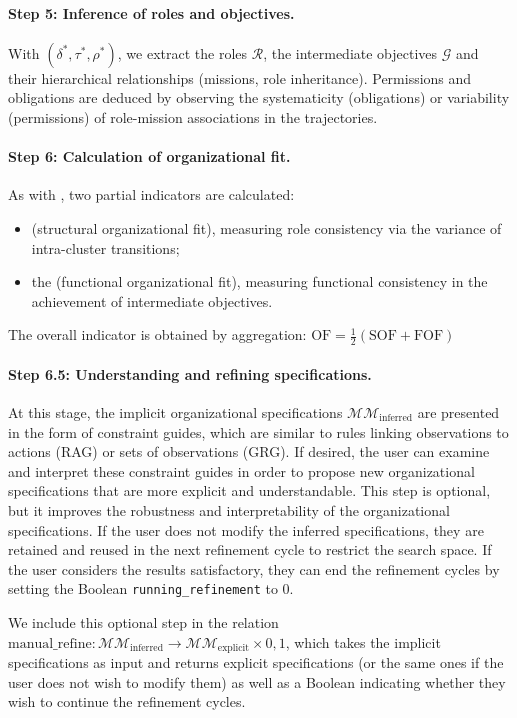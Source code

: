 \begin{itemize}
\paragraph{Step 5: Inference of roles and objectives. }
With $(\delta^*, \tau^*, \rho^*)$, we extract the roles $\mathcal{R}$, the intermediate objectives $\mathcal{G}$ and their hierarchical relationships (missions, role inheritance).
Permissions and obligations are deduced by observing the systematicity (obligations) or variability (permissions) of role-mission associations in the trajectories.

\paragraph{Step 6: Calculation of organizational fit.}
As with , two partial indicators are calculated:
\begin{itemize}
  \item \textbf{} (structural organizational fit), measuring role consistency via the variance of intra-cluster transitions;
  \item the \textbf{} (functional organizational fit), measuring functional consistency in the achievement of intermediate objectives.
\end{itemize}
The overall indicator is obtained by aggregation:
$\text{OF} = \frac{1}{2}(\text{SOF} + \text{FOF})$

\paragraph{Step 6.5: Understanding and refining specifications.}
At this stage, the implicit organizational specifications $\mathcal{MM}_{\text{inferred}}$ are presented in the form of constraint guides, which are similar to rules linking observations to actions (RAG) or sets of observations (GRG). If desired, the user can examine and interpret these constraint guides in order to propose new organizational specifications that are more explicit and understandable. This step is optional, but it improves the robustness and interpretability of the organizational specifications. If the user does not modify the inferred specifications, they are retained and reused in the next refinement cycle to restrict the search space. If the user considers the results satisfactory, they can end the refinement cycles by setting the Boolean \texttt{running_refinement} to 0.

We include this optional step in the relation $\text{manual_refine}: \mathcal{MM}_{\text{inferred}} \rightarrow \mathcal{MM}_{\text{explicit}} \times {0,1}$, which takes the implicit specifications as input and returns explicit specifications (or the same ones if the user does not wish to modify them) as well as a Boolean indicating whether they wish to continue the refinement cycles.


\end{itemize}
